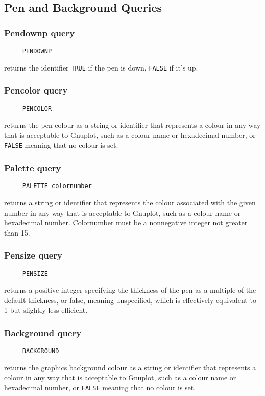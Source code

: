 \subsection{Pen and Background Queries}

\subsubsection*{Pendownp query}
\begin{verbatim}
     PENDOWNP
\end{verbatim}
returns the identifier \texttt{TRUE} if the pen is down,
\texttt{FALSE} if it's up.

\subsubsection*{Pencolor query}
\begin{verbatim}
     PENCOLOR
\end{verbatim}
\label{logoturtle:pencolor}
returns the pen colour as a string or identifier that represents a
colour in any way that is acceptable to Gnuplot, such as a colour name
or hexadecimal number, or \texttt{FALSE} meaning that no colour is
set.

\subsubsection*{Palette query}
\begin{verbatim}
     PALETTE colornumber
\end{verbatim}
returns a string or identifier that represents the colour associated
with the given number in any way that is acceptable to Gnuplot, such
as a colour name or hexadecimal number.  Colornumber must be a
nonnegative integer not greater than 15.

\subsubsection*{Pensize query}
\begin{verbatim}
     PENSIZE
\end{verbatim}
returns a positive integer specifying the thickness of the pen as a
multiple of the default thickness, or false, meaning unspecified,
which is effectively equivalent to 1 but slightly less efficient.

\subsubsection*{Background query}
\begin{verbatim}
     BACKGROUND
\end{verbatim}
returns the graphics background colour as a string or identifier that
represents a colour in any way that is acceptable to Gnuplot, such as
a colour name or hexadecimal number, or \texttt{FALSE} meaning that no
colour is set.


